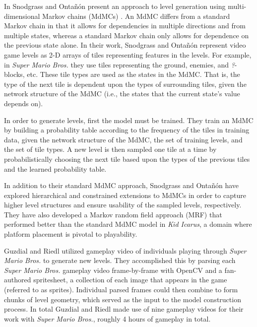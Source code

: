 \documentclass[12pt]{report}
\begin{document}
In \cite{snodgrass2014experiments} Snodgrass and Onta{\~n}{\'o}n present an approach to level generation using multi-dimensional Markov chains (MdMCs) \cite{ching2007multi}. An MdMC differs from a standard Markov chain in that it allows for dependencies in multiple directions and from multiple states, whereas a standard Markov chain only allows for dependence on the previous state alone. In their work, Snodgrass and Onta{\~n}{\'o}n represent video game levels as 2-D arrays of tiles representing features in the levels. For example, in \textit{Super Mario Bros.} they use tiles representing the ground, enemies, and {\em ?}-blocks, etc. These tile types are used as the states in the MdMC. That is, the type of the next tile is dependent upon the types of surrounding tiles, given the network structure of the MdMC (i.e., the states that the current state's value depends on).

In order to generate levels, first the model must be trained. They train an MdMC by building a probability table according to the frequency of the tiles in training data, given the network structure of the MdMC, the set of training levels, and the set of tile types. A new level is then sampled one tile at a time by probabilistically choosing the next tile based upon the types of the previous tiles and the learned probability table.

In addition to their standard MdMC approach, Snodgrass and Onta{\~n}{\'o}n have explored hierarchical \cite{snodgrass2015hierarchical} and constrained \cite{snodgrassconstrained} extensions to MdMCs in order to capture higher level structures and ensure usability of the sampled levels, respectively. They have also developed a Markov random field approach (MRF) \cite{snodgrass2016learning} that performed better than the standard MdMC model in \textit{Kid Icarus}, a domain where platform placement is pivotal to playability.


 Guzdial and Riedl utilized gameplay video of individuals playing through \textit{Super Mario Bros.} to generate new levels. They accomplished this by parsing each \textit{Super Mario Bros.} gameplay video frame-by-frame with OpenCV \cite{Pulli:2012:RCV:2184319.2184337} and a fan-authored spritesheet, a collection of each image that appears in the game (referred to as sprites). Individual parsed frames could then combine to form chunks of level geometry, which served as the input to the model construction process. In total Guzdial and Riedl made use of nine gameplay videos for their work with \textit{Super Mario Bros.}, roughly 4 hours of gameplay in total.
\end{document}
